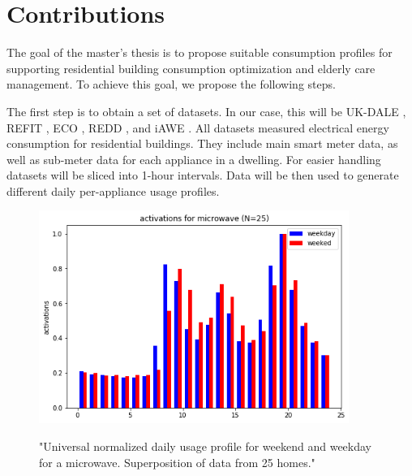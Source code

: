 
\chapter{Contributions} %

\label{Chapter5} %


The goal of the master's thesis is to propose suitable consumption profiles for supporting residential building consumption optimization and elderly care management.
To achieve this goal, we propose the following steps.

The first step is to obtain a set of datasets. In our case, this will be UK-DALE \cite{UKDALE}, REFIT \cite{REFIT}, ECO \cite{ECO}, REDD \cite{REDD}, and iAWE \cite{iAWE}.
All datasets measured electrical energy consumption for residential buildings. 
They include main smart meter data, as well as sub-meter data for each appliance in a dwelling. 
For easier handling datasets will be sliced into 1-hour intervals. 
Data will be then used to generate different daily per-appliance usage profiles.

\begin{figure}[h!]
	\centering
	\caption{"Universal normalized daily usage profile for weekend and weekday for a microwave. Superposition of data from 25 homes."}
	\includegraphics[width=0.9\textwidth]{../Figures/microwave_norm_n25.png}
	\label{fig:UniNormMicrowave}
\end{figure}

